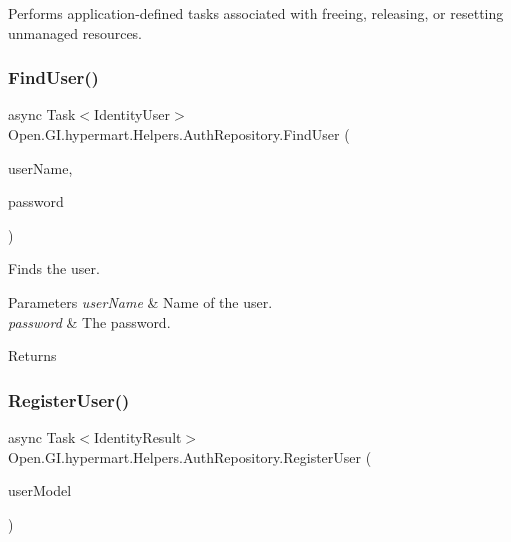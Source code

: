 Performs application-\/defined tasks associated with freeing, releasing, or resetting unmanaged resources. 

\hypertarget{class_open_1_1_g_i_1_1hypermart_1_1_helpers_1_1_auth_repository_afe19f379cb79c18b95ae18be218960a6}{}\label{class_open_1_1_g_i_1_1hypermart_1_1_helpers_1_1_auth_repository_afe19f379cb79c18b95ae18be218960a6} 
\subsubsection{\texorpdfstring{Find\+User()}{FindUser()}}
{\footnotesize\ttfamily async Task$<$Identity\+User$>$ Open.\+G\+I.\+hypermart.\+Helpers.\+Auth\+Repository.\+Find\+User (\begin{DoxyParamCaption}\item[{string}]{user\+Name,  }\item[{string}]{password }\end{DoxyParamCaption})}



Finds the user. 


\begin{DoxyParams}{Parameters}
{\em user\+Name} & Name of the user.\\
\hline
{\em password} & The password.\\
\hline
\end{DoxyParams}
\begin{DoxyReturn}{Returns}

\end{DoxyReturn}
\hypertarget{class_open_1_1_g_i_1_1hypermart_1_1_helpers_1_1_auth_repository_aedc26a57af08ecb4a9cae4ab46055bf9}{}\label{class_open_1_1_g_i_1_1hypermart_1_1_helpers_1_1_auth_repository_aedc26a57af08ecb4a9cae4ab46055bf9} 
\subsubsection{\texorpdfstring{Register\+User()}{RegisterUser()}}
{\footnotesize\ttfamily async Task$<$Identity\+Result$>$ Open.\+G\+I.\+hypermart.\+Helpers.\+Auth\+Repository.\+Register\+User (\begin{DoxyParamCaption}\item[{\hyperlink{class_open_1_1_g_i_1_1hypermart_1_1_models_1_1_user_model}{User\+Model}}]{user\+Model }\end{DoxyParamCaption})}




